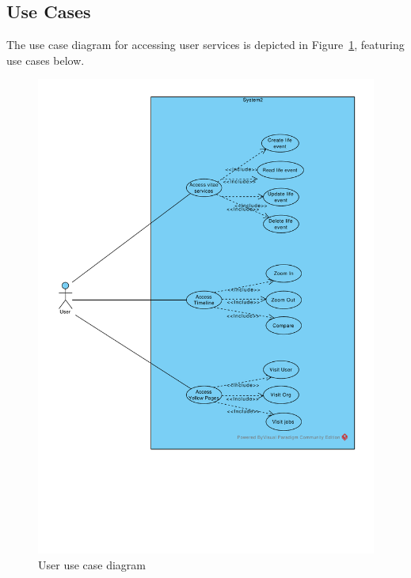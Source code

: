 \subsection{Use Cases}
\label{sec:user-use-cases}
The use case diagram for accessing user services is depicted in
Figure~\ref{fig:user-use-cases}, featuring use cases below.
%
\begin{figure}[htpb]
  \centering
  \includegraphics[scale=0.55]{figures/user-use-cases.pdf}
  \caption{User use case diagram}
  \label{fig:user-use-cases}
\end{figure}
%

%
\begin{use-case}
  
\end{use-case}
\begin{use-case}
  
\end{use-case}
\begin{use-case}
  
\end{use-case}

